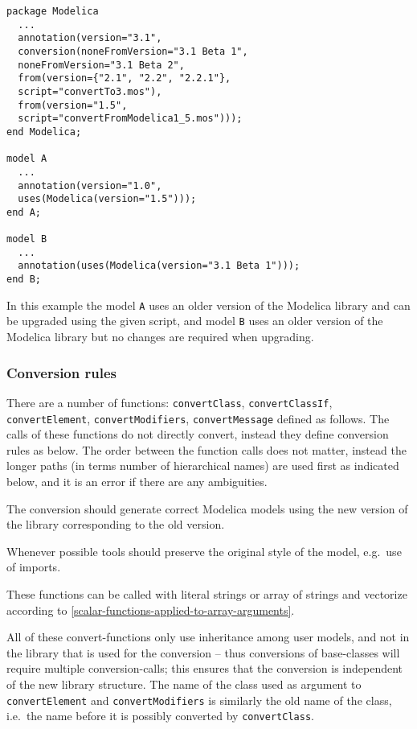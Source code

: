 \begin{example}
\begin{lstlisting}[language=modelica]
package Modelica
  ...
  annotation(version="3.1",
  conversion(noneFromVersion="3.1 Beta 1",
  noneFromVersion="3.1 Beta 2",
  from(version={"2.1", "2.2", "2.2.1"},
  script="convertTo3.mos"),
  from(version="1.5",
  script="convertFromModelica1_5.mos")));
end Modelica;

model A
  ...
  annotation(version="1.0",
  uses(Modelica(version="1.5")));
end A;

model B
  ...
  annotation(uses(Modelica(version="3.1 Beta 1")));
end B;
\end{lstlisting}
In this example the model \lstinline!A! uses an older version of the
Modelica library and can be upgraded using the given script, and model
\lstinline!B! uses an older version of the Modelica library but no changes are
required when upgrading.
\end{example}

\subsubsection{Conversion rules}\label{conversion-rules}

There are a number of functions: \lstinline!convertClass!, \lstinline!convertClassIf!,
\lstinline!convertElement!, \lstinline!convertModifiers!, \lstinline!convertMessage! defined as follows. The
calls of these functions do not directly convert, instead they define
conversion rules as below. The order between the function calls does not
matter, instead the longer paths (in terms number of hierarchical names)
are used first as indicated below, and it is an error if there are any
ambiguities.

The conversion should generate correct Modelica models using the new version of the library
corresponding to the old version.

\begin{nonnormative}
Whenever possible tools should preserve the original style of the model, e.g.\ use of imports.
\end{nonnormative}

These functions can be called with literal strings or array of strings
and vectorize according to \cref{scalar-functions-applied-to-array-arguments}.

All of these convert-functions only use inheritance among user
models, and not in the library that is used for the conversion -- thus
conversions of base-classes will require multiple conversion-calls; this
ensures that the conversion is independent of the new library structure.
The name of the class used as argument to \lstinline!convertElement! and \lstinline!convertModifiers!
is similarly the old name of the class, i.e.\ the name before it is
possibly converted by \lstinline!convertClass!.


